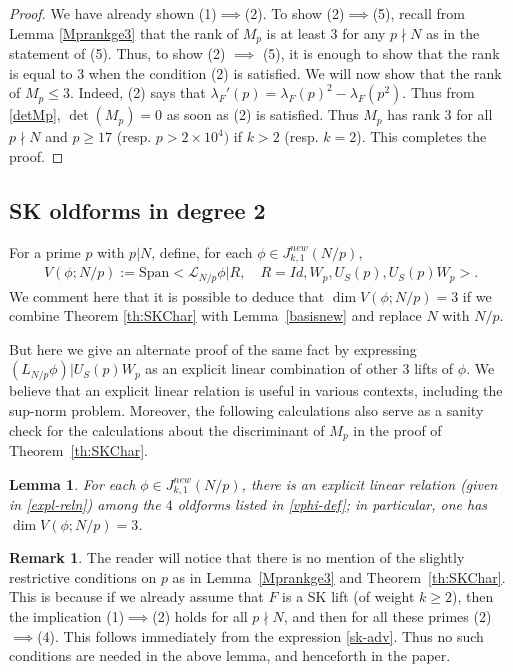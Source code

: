 \documentclass[11pt]{amsart}
\numberwithin{equation}{section}
\theoremstyle{plain}
\newtheorem{lem}[thm]{Lemma}
\theoremstyle{definition}
\newtheorem{rmk}[thm]{Remark}
\newcommand{\thmref}[1]{Theorem~\ref{#1}}
\newcommand{\lemref}[1]{Lemma~\ref{#1}}
\newcommand{\mc}{\mathcal}
\newcommand{\mrm}{\mathrm}
\newcommand{\q}{\quad}
\begin{document}
\begin{proof}
    We have already shown (1)$\implies$(2). To show (2)$\implies$(5), recall from Lemma \ref{Mprankge3} that the rank of $M_p$ is at least $3$ for any $p\nmid N$ as in the statement of (5). Thus, to show (2) $\implies$ (5), it is enough to show that the rank is equal to $3$ when the condition (2) is satisfied. 
We will now show that the rank of $M_p \le 3$.
Indeed, (2) says that $\lambda_F'(p)=\lambda_F(p)^2-\lambda_F(p^2)$. Thus from \eqref{detMp}, $\det(M_p)=0$ as soon as (2) is satisfied. Thus $M_p$ has rank $3$ for all $p\nmid N$ and $p\ge 17$ (resp. $p> 2\times 10^4)$ if $k>2$ (resp. $k=2$). This completes the proof.
\end{proof}

\subsection{SK oldforms in degree 2}
For a prime $p$ with $p|N$, define, for each $\phi \in J_{k,1}^{new}(N/p)$,
\begin{align} \label{vphi-def}
  V(\phi;N/p):= \mrm{Span}< \mc L_{N/p} \phi |R, \q R=Id, W_p, U_S(p), U_S(p)W_p>.
\end{align}
We comment here that it is possible to deduce that $\dim V(\phi;N/p)=3$ if we combine Theorem \ref{th:SKChar} with \lemref{basisnew} and replace $N$ with $N/p$. 

But here we give an alternate proof of the same fact by expressing $(L_{N/p} \phi )|U_S(p)W_p$ as an explicit linear combination of other $3$ lifts of $\phi$. We believe that an explicit linear relation is useful in various contexts, including the sup-norm problem. Moreover, the following calculations also serve as a sanity check for the calculations about the discriminant of $M_p$ in the proof of \thmref{th:SKChar}.


\begin{lem} \label{dim=3}
    For each $\phi \in J_{k,1}^{new}(N/p)$, there is an explicit linear relation (given in \eqref{expl-reln}) among the $4$ oldforms listed in \eqref{vphi-def}; in particular,
    one has $\dim V(\phi;N/p)=3$.
\end{lem}

\begin{rmk}
The reader will notice that there is no mention of the slightly restrictive conditions on $p$ as in Lemma~\ref{Mprankge3} and Theorem~\ref{th:SKChar}. This is because if we already assume that $F$ is a SK lift (of weight $k \ge 2$), then the implication (1)$\implies$(2) holds for all $p \nmid N$, and then for all these primes (2)$\implies$(4). This follows immediately from the expression \eqref{sk-adv}. Thus no such conditions are needed in the above lemma, and henceforth in the paper. 
\end{rmk}
\end{document}
